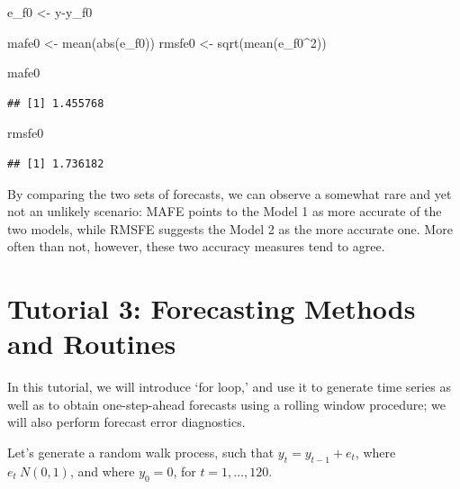 \documentclass[
  12pt,
  oneside]{book}
\newenvironment{Shaded}{\begin{snugshade}}{\end{snugshade}}
\newcommand{\DecValTok}[1]{\textcolor[rgb]{0.00,0.00,0.81}{#1}}
\newcommand{\FunctionTok}[1]{\textcolor[rgb]{0.00,0.00,0.00}{#1}}
\newcommand{\NormalTok}[1]{#1}
\newcommand{\OtherTok}[1]{\textcolor[rgb]{0.56,0.35,0.01}{#1}}
\newcommand{\SpecialCharTok}[1]{\textcolor[rgb]{0.00,0.00,0.00}{#1}}
\begin{document}
\begin{Shaded}
\begin{Highlighting}[]
\NormalTok{e\_f0 }\OtherTok{\textless{}{-}}\NormalTok{ y}\SpecialCharTok{{-}}\NormalTok{y\_f0}

\NormalTok{mafe0 }\OtherTok{\textless{}{-}} \FunctionTok{mean}\NormalTok{(}\FunctionTok{abs}\NormalTok{(e\_f0))}
\NormalTok{rmsfe0 }\OtherTok{\textless{}{-}} \FunctionTok{sqrt}\NormalTok{(}\FunctionTok{mean}\NormalTok{(e\_f0}\SpecialCharTok{\^{}}\DecValTok{2}\NormalTok{))}

\NormalTok{mafe0}
\end{Highlighting}
\end{Shaded}

\begin{verbatim}
## [1] 1.455768
\end{verbatim}

\begin{Shaded}
\begin{Highlighting}[]
\NormalTok{rmsfe0}
\end{Highlighting}
\end{Shaded}

\begin{verbatim}
## [1] 1.736182
\end{verbatim}

By comparing the two sets of forecasts, we can observe a somewhat rare and yet not an unlikely scenario: MAFE points to the Model 1 as more accurate of the two models, while RMSFE suggests the Model 2 as the more accurate one. More often than not, however, these two accuracy measures tend to agree.

\hypertarget{tutorial-3-forecasting-methods-and-routines}{%
\chapter*{Tutorial 3: Forecasting Methods and Routines}\label{tutorial-3-forecasting-methods-and-routines}}

In this tutorial, we will introduce `for loop,' and use it to generate time series as well as to obtain one-step-ahead forecasts using a rolling window procedure; we will also perform forecast error diagnostics.

Let's generate a random walk process, such that \(y_{t} = y_{t-1}+e_{t}\), where \(e_{t} ~ N(0,1)\), and where \(y_{0}=0\), for \(t=1,\ldots,120\).
\end{document}
